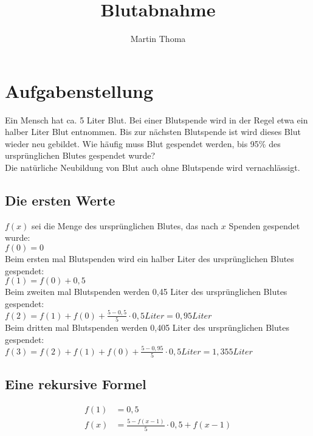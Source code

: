 \documentclass[a4paper,9pt]{scrartcl}
\begin{document}
 \title{Blutabnahme}
 \author{Martin Thoma}

 \setcounter{section}{1}
 \section*{Aufgabenstellung}
    Ein Mensch hat ca. 5 Liter Blut. Bei einer Blutspende wird in der Regel etwa
    ein halber Liter Blut entnommen. Bis zur nächsten Blutspende ist wird dieses
    Blut wieder neu gebildet. Wie häufig muss Blut gespendet werden, bis 95\%
    des ursprünglichen Blutes gespendet wurde?\\

    \noindent Die natürliche Neubildung von Blut auch ohne Blutspende wird vernachlässigt.

    \subsection{Die ersten Werte}
    $f(x)$ sei die Menge des ursprünglichen Blutes, das nach $x$ Spenden gespendet
    wurde:\\
    $f(0) = 0$\\
    Beim ersten mal Blutspenden wird ein halber Liter des ursprünglichen Blutes
    gespendet:\\
    $f(1) = f(0) + 0{,}5$\\
    Beim zweiten mal Blutspenden werden 0,45 Liter des ursprünglichen Blutes
    gespendet:\\
    $f(2) = f(1) + f(0) + \frac{5-0{,}5}{5} \cdot 0{,}5 Liter = 0{,}95 Liter $\\
    Beim dritten mal Blutspenden werden 0,405 Liter des ursprünglichen Blutes
    gespendet:\\
    $f(3) = f(2) + f(1) + f(0) + \frac{5-0{,}95}{5} \cdot 0{,}5 Liter = 1{,}355 Liter$

    \subsection{Eine rekursive Formel}
        \begin{align}
            f(1) &= 0{,}5 \\
            f(x) &= \frac{5-f(x-1)}{5} \cdot 0{,}5 + f(x-1)
        \end{align}
\end{document}
